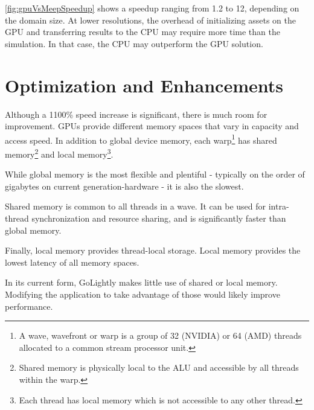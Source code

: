 \autoref{fig:gpuVsMeepSpeedup} shows a speedup ranging from 1.2 to 12, depending on the domain size. At lower resolutions, the overhead of initializing assets on the GPU and transferring results to the CPU may require more time than the simulation. In that case, the CPU may outperform the GPU solution.

\section{Optimization and Enhancements}

Although a 1100\% speed increase is significant, there is much room for improvement. GPUs provide different memory spaces that vary in capacity and access speed. In addition to global device memory, each warp\footnote{A wave, wavefront or warp is a group of 32 (NVIDIA) or 64 (AMD) threads allocated to a common stream processor unit.} has shared memory\footnote{Shared memory is physically local to the ALU and accessible by all threads within the warp.} and local memory\footnote{Each thread has local memory which is not accessible to any other thread.}.

While global memory is the most flexible and plentiful - typically on the order of gigabytes on current generation-hardware - it is also the slowest. 

Shared memory is common to all threads in a wave. It can be used for intra-thread synchronization and resource sharing, and is significantly faster than global memory.

Finally, local memory provides thread-local storage. Local memory provides the lowest latency of all memory spaces.

In its current form, GoLightly makes little use of shared or local memory. Modifying the application to take advantage of those would likely improve performance.







